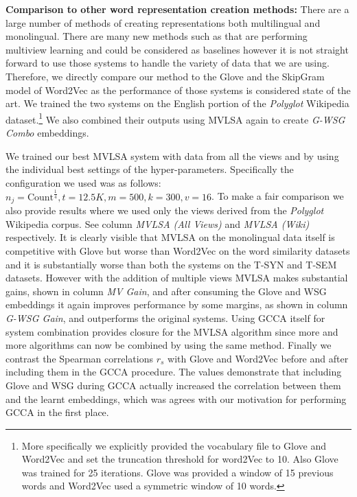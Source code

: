 \documentclass[11pt]{article}
\begin{document}
\noindent\textbf{Comparison to other word representation creation methods:}
There are a large number of methods of creating representations both
multilingual and monolingual. There are many new methods such as
that are performing multiview learning and could be considered as
baselines however it is not straight forward to use those systems to
handle the variety of data that we are using. Therefore, we directly
compare our method to the Glove and the SkipGram model of Word2Vec as
the performance of those systems is considered state of the art.  
We trained the two systems on the English portion of the
\textit{Polyglot} Wikipedia dataset.\footnote{More specifically
we explicitly provided the vocabulary file to Glove and Word2Vec and set the
truncation threshold for word2Vec to 10. Also Glove was trained for 25
iterations. Glove was provided a window of 15 previous words and Word2Vec
used a symmetric window of 10 words.} We also combined their outputs
using MVLSA again to create \emph{G-WSG Combo} embeddings.

We trained our best MVLSA system with data from all the views and by
using the individual best settings of 
the hyper-parameters. Specifically the configuration we used was as
follows: $n_j = \text{Count}^\frac{1}{4}, t=12.5K, m=500, k=300,
v=16$. To make a fair comparison we also provide 
results where we used only the views derived from the \textit{Polyglot}
Wikipedia corpus. See column \emph{MVLSA (All Views)} and \emph{MVLSA
  (Wiki)} respectively. It is clearly visible that MVLSA on the
monolingual data itself is competitive with Glove but
worse than Word2Vec on the word similarity datasets and it is
substantially worse than both the systems on the T-SYN 
and T-SEM datasets. However with the addition of multiple views MVLSA
makes substantial gains, shown in column \emph{MV Gain}, and after consuming the Glove and WSG
embeddings it again improves performance by some margins, as shown in
column \emph{G-WSG Gain}, and outperforms the original systems. 
Using GCCA itself for system combination provides closure
for the MVLSA algorithm since more and more algorithms can now be
combined by using the same method. Finally we contrast the Spearman
correlations $r_s$ with Glove and Word2Vec before and after including
them in the GCCA procedure. The values demonstrate that including Glove and WSG
  during GCCA actually increased the  correlation between them and the
  learnt embeddings, which was agrees with our motivation for
  performing GCCA in the first place.
\end{document}
